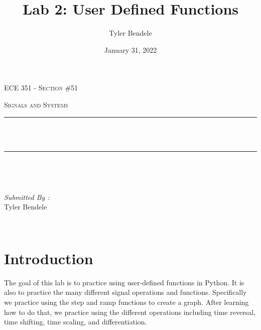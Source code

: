 \documentclass[12pt]{report}
\title{Lab 2: User Defined Functions}
\author{Tyler Bendele}
\date{January 31, 2022}
\makeatletter
\let\thetitle\@title
\makeatother
\begin{document}
\begin{titlepage}
\centering
\vspace*{0.5 cm}

\begin{center}    \textsc{\Large   ECE 351 - Section \#51 }\\[2.0 cm]
\end{center}%
\textsc{\Large Signals and Systems  }\\[0.5 cm] %

\rule{\linewidth}{0.2 mm} \\[0.4 cm]
{ \huge \bfseries \thetitle}\\
\rule{\linewidth}{0.2 mm} \\[1.5 cm]
\begin{minipage}{0.4\textwidth}
\begin{flushleft} \large
\end{flushleft}
\end{minipage}~
\begin{minipage}{0.4\textwidth}
\begin{flushright} \large
\emph{Submitted By :} \\
Tyler Bendele
\end{flushright}
\end{minipage}\\[2 cm]
\end{titlepage}
\tableofcontents
\pagebreak
\renewcommand{\thesection}{\arabic{section}}
\section{Introduction}
The goal of this lab is to practice using user-defined functions in Python.
It is also to practice the many different signal operations and functions.
Specifically we practice using the step and ramp functions to create a
graph. After learning how to do that, we practice using the different operations including time reversal, time shifting, time scaling, and
differentiation.
\end{document}
